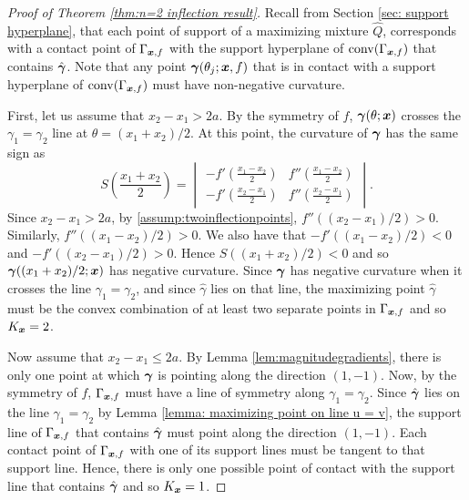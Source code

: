 \begin{proof}[Proof of Theorem \ref{thm:n=2 inflection result}]
			Recall from Section \ref{sec: support hyperplane}, that each point of support of a maximizing mixture $\hat{Q}$, corresponds with a contact point of $\Gamma_{{\bm{{x}}}, f}$ with the support hyperplane of $\mathrm{conv}(\Gamma_{{\bm{{x}}}, f})$ that contains $\hat{{\bm{{\gamma}}}}$. Note that any point ${\bm{{\gamma}}}(\theta_j;{\bm{{x}}},f)$ that is in contact with a support hyperplane of $\mathrm{conv}(\Gamma_{{\bm{{x}}}, f})$ must have non-negative curvature.

			First, let us assume that $x_2 - x_1 > 2a$. By the symmetry of $f$, ${\bm{{\gamma}}}(\theta;{\bm{{x}}})$ crosses the $\gamma_1 = \gamma_2$ line at $\theta = (x_1 + x_2)/2$. At this point, the curvature of ${\bm{{\gamma}}}$ has the same sign as
			\begin{equation}
				S\left(\frac{x_1+x_2}{2}\right) = 
				\begin{vmatrix}
					-f'(\frac{x_1 - x_2}{2}) & f''(\frac{x_1 - x_2}{2})\\
					-f'(\frac{x_2 - x_1}{2}) & f''(\frac{x_2 - x_1}{2})
				\end{vmatrix}.
			\end{equation}
			Since $x_2 - x_1 > 2a$, by \ref{assump:twoinflectionpoints},  $f''((x_2 - x_1)/2)>0$. Similarly, $f''((x_1 - x_2)/2) > 0$. We also have that $-f'((x_1 - x_2)/2) < 0$ and $-f'((x_2 - x_1)/2) > 0$. Hence $S((x_1 + x_2)/2)<0$ and so ${\bm{{\gamma}}}((x_1 + x_2)/2;{\bm{{x}}})$ has negative curvature. Since ${\bm{{\gamma}}}$ has negative curvature when it crosses the line $\gamma_1 = \gamma_2$, and since $\hat{\gamma}$ lies on that line, the maximizing point $\hat{\gamma}$ must be the convex combination of at least two separate points in $\Gamma_{{\bm{{x}}},f}$ and so $K_{\bm{{x}}} = 2$.

			
			Now assume that $x_2 - x_1 \leq 2a$. By Lemma \ref{lem:magnitudegradients}, there is only one point at which ${\bm{{\gamma}}}$ is pointing along the direction $(1,-1)$. Now, by the symmetry of $f$, $\Gamma_{{\bm{{x}}}, f}$ must have a line of symmetry along $\gamma_1 = \gamma_2$. Since $\hat{{\bm{{\gamma}}}}$ lies on the line $\gamma_1 = \gamma_2$ by Lemma \ref{lemma: maximizing point on line u = v}, the support line of $\Gamma_{{\bm{{x}}},f}$ that contains $\hat{{\bm{{\gamma}}}}$ must point along the direction $(1, -1)$. Each contact point of $\Gamma_{{\bm{{x}}}, f}$ with one of its support lines must be tangent to that support line. Hence, there is only one possible point of contact with the support line that contains $\hat{{\bm{{\gamma}}}}$ and so $K_{\bm{{x}}} = 1$.


\end{proof}
